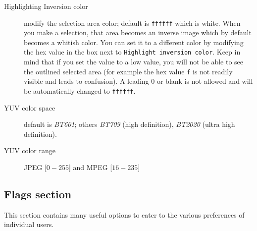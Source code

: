 \begin{description}
    \item[Highlighting Inversion color] modify the selection area color; default is \texttt{ffffff} which is white. When you make a selection, that area becomes an inverse image which by default becomes a whitish color.  You can set it to a different color by modifying the hex value in the box next to \texttt{Highlight inversion color}.   Keep in mind that if you set the value to a low value, you will not be able to see the outlined selected area (for example the hex value \texttt{f} is not readily visible and leads to confusion).  A leading 0 or blank is not allowed and will be automatically changed to \texttt{ffffff}.
    \item[YUV color space] default is \textit{BT601}; others \textit{BT709} (high definition), \textit{BT2020} (ultra high definition).
    \item[YUV color range] JPEG [$0-255$] and MPEG [$16-235$]
\end{description}

\subsection{Flags section}%
\label{sub:flags_section}

This section contains many useful options to cater to the various preferences of individual users.

